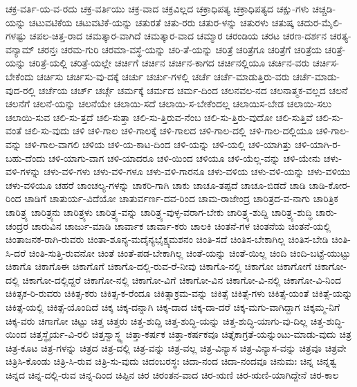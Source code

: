{ಚಕ್ರ-ವರ್ತಿ-ಯ-ವ-ರದು
ಚಕ್ರ-ವರ್ತಿಯು
ಚಕ್ರ-ವಾದ
ಚಕ್ರವಿಲ್ಲದ
ಚಕ್ರಾಧಿಪತ್ಯ
ಚಕ್ರಾಧಿಪತ್ಯದ
ಚಕ್ಷು-ಗಳು
ಚಚ್ಚಡಿ-ಯನ್ನು
ಚಟುವಟಿಕೆಯ
ಚಟುವಟಿಕೆ-ಯನ್ನು
ಚತುರತೆ
ಚತು-ರರು
ಚತುರ-ಳನ್ನು
ಚತುರಳು
ಚತುಷ್ಕ
ಚದುರ-ಮೈಲಿ-ಗಳಷ್ಟು
ಚಪಲ-ಚಿತ್ತ-ರಾದ
ಚಮತ್ಕಾರ-ವಾಗಿದೆ
ಚಮತ್ಕಾರ-ವಾದ
ಚಮ್ಮಾರ
ಚರಂಡಿಯ
ಚರಟ
ಚರಣ-ದರ್ಶನ
ಚರತ್ಯ-ವನ್ಯಾಮ್
ಚರನ್ತಃ
ಚರಮ-ಗುರಿ
ಚರಮಾ-ವಸ್ಥೆ-ಯನ್ನು
ಚರಿ-ತೆ-ಯನ್ನು
ಚರಿತ್ರೆ
ಚರಿತ್ರೆಗೂ
ಚರಿತ್ರೆಗೆ
ಚರಿತ್ರೆಯ
ಚರಿತ್ರೆ-ಯನ್ನು
ಚರಿತ್ರೆ-ಯಲ್ಲಿ
ಚರಿತ್ರೆ-ಯಲ್ಲೇ
ಚರ್ಚಿಗೆ
ಚರ್ಚಿನ
ಚರ್ಚಿನ-ಕಾಗದ
ಚರ್ಚಿನಲ್ಲಿಯೂ
ಚರ್ಚಿನ-ವರು
ಚರ್ಚಿಸ-ಬೇಕೆಂದು
ಚರ್ಚಿಸು
ಚರ್ಚಿಸು-ವು-ದಕ್ಕೆ
ಚರ್ಚು
ಚರ್ಚು-ಗಳಲ್ಲಿ
ಚರ್ಚೆ
ಚರ್ಚೆ-ಮಾಡುತ್ತಿರು-ವರು
ಚರ್ಚೆ-ಮಾಡು-ವುದ-ರಲ್ಲಿ
ಚರ್ಚೆಯ
ಚರ್ಚ್
ಚರ್ಚ್ಗೆ
ಚರ್ಮಕ್ಕೆ
ಚರ್ಮದ
ಚರ್ಮ-ದಿಂದ
ಚಲನವಲ-ನದ
ಚಲನಾತ್ಮಕ-ವಲ್ಲದ
ಚಲನೆ
ಚಲನೆಗೆ
ಚಲನೆ-ಯನ್ನು
ಚಲನೆಯೇ
ಚಲಾಯಿ-ಸದೆ
ಚಲಾಯಿ-ಸ-ಬೇಕೆಂದಲ್ಲ
ಚಲಾಯಿಸ-ಬೇಡ
ಚಲಾಯಿ-ಸಲು
ಚಲಾಯಿ-ಸುವ
ಚಲಿ-ಸು-ತ್ತದೆ
ಚಲಿ-ಸುತ್ತಾ
ಚಲಿ-ಸು-ತ್ತಿರುವ-ನೆಂಬ
ಚಲಿ-ಸು-ತ್ತಿರು-ವುದೋ
ಚಲಿ-ಸುತ್ತಿವೆ
ಚಲಿ-ಸು-ವಂತೆ
ಚಲಿ-ಸು-ವುದು
ಚಳಿ
ಚಳಿ-ಗಾಲ
ಚಳಿ-ಗಾಲಕ್ಕೆ
ಚಳಿ-ಗಾಲದ
ಚಳಿ-ಗಾಲ-ದಲ್ಲಿ
ಚಳಿ-ಗಾಲ-ದಲ್ಲಿಯೂ
ಚಳಿ-ಗಾಲ-ವನ್ನು
ಚಳಿ-ಗಾಲ-ವಾಗಲಿ
ಚಳಿಯ
ಚಳಿ-ಯ-ಕಾಟ-ದಿಂದ
ಚಳಿ-ಯನ್ನು
ಚಳಿ-ಯಲ್ಲಿ
ಚಳಿ-ಯಾಗಿತ್ತು
ಚಳಿ-ಯಾಗಿ-ರ-ಬಹು-ದೆಂದು
ಚಳಿ-ಯಾಗು-ವಾಗ
ಚಳಿ-ಯಾದರೂ
ಚಳಿ-ಯಿಂದ
ಚಳಿಯೂ
ಚಳಿ-ಯೆಲ್ಲ-ವನ್ನು
ಚಳಿ-ಯೇನು
ಚಳು-ವಳಿ-ಗಳನ್ನು
ಚಳು-ವಳಿ-ಗಳು
ಚಳು-ವಳಿ-ಗಳೂ
ಚಳು-ವಳಿ-ಗಾರನೂ
ಚಳು-ವಳಿಯ
ಚಳು-ವಳಿ-ಯನ್ನು
ಚಳು-ವಳಿಯು
ಚಳು-ವಳಿಯೂ
ಚಹರೆ
ಚಾಂಚಲ್ಯ-ಗಳನ್ನು
ಚಾಕರಿ-ಗಾಗಿ
ಚಾಕು
ಚಾಚೂ-ತಪ್ಪದೆ
ಚಾಚೂ-ಬಿಡದೆ
ಚಾಡಿ
ಚಾಡಿ-ಕೋರ-ರಿಂದ
ಚಾಡಿಗೆ
ಚಾತುರ್ಯ-ವಿದೆಯೋ
ಚಾತುರ್ವರ್ಣ-ದವ-ರಿಂದ
ಚಾಮ-ರಾಜೇಂದ್ರ
ಚಾರಿತ್ರದ-ವ-ನಾಗು
ಚಾರಿತ್ರಿಕ
ಚಾರಿತ್ರ್ಯ
ಚಾರಿತ್ರ್ಯನು
ಚಾರಿತ್ರ್ಯಳು
ಚಾರಿತ್ರ್ಯ-ವನ್ನು
ಚಾರಿತ್ರ್ಯ-ವುಳ್ಳ-ವರಾಗ-ಬೇಕು
ಚಾರಿತ್ರ್ಯ-ಶುದ್ದಿ
ಚಾರಿತ್ರ್ಯ-ಶುದ್ಧಿ
ಚಾರು-ಚಂದ್ರರ
ಚಾರುವಿನ
ಚಾರ್ಜು-ಮಾಡಿ
ಚಾರ್ವಾಕ
ಚಾರ್ವಾ-ಕರು
ಚಾಲಕಿ
ಚಿಂತನೆ-ಗಳ
ಚಿಂತನೆಯ
ಚಿಂತನೆ-ಯಲ್ಲಿ
ಚಿಂತಾಜನಕ-ರಾಗಿ-ರುವರು
ಚಿಂತಾ-ಶೂನ್ಯ-ಮದೈನ್ಯಭೈಕ್ಷ್ಯಮಶನಂ
ಚಿಂತಿ-ಸದೆ
ಚಿಂತಿಸ-ಬೇಕಾಗಿಲ್ಲ
ಚಿಂತಿಸ-ಬೇಡಿ
ಚಿಂತಿ-ಸಿ-ದರೆ
ಚಿಂತಿ-ಸುತ್ತಿ-ರುವನೋ
ಚಿಂತೆ
ಚಿಂತೆ-ಪಡ-ಬೇಕಾಗಿಲ್ಲ
ಚಿಂತೆ-ಯನ್ನು
ಚಿಂತೆ-ಯಿಲ್ಲ
ಚಿಂದಿ
ಚಿಂದಿ-ಬಟ್ಟೆ-ಯುಟ್ಟು
ಚಿಕಾಗೊ
ಚಿಕಾಗೊಈ
ಚಿಕಾಗೊಗೆ
ಚಿಕಾಗೊ-ದಲ್ಲಿ-ರುವ-ರೆ-ನೀವು
ಚಿಕಾಗೊ-ನಲ್ಲಿ
ಚಿಕಾಗೋ
ಚಿಕಾಗೋಗೆ
ಚಿಕಾಗೋ-ದಲ್ಲಿ
ಚಿಕಾಗೋ-ದಲ್ಲಿದ್ದರೆ
ಚಿಕಾಗೋ-ನಲ್ಲಿ
ಚಿಕಾಗೋ-ವಿಗೆ
ಚಿಕಾಗೋ-ವಿನ
ಚಿಕಾಗೋ-ವಿ-ನಲ್ಲಿ
ಚಿಕಾಗೋ-ವಿ-ನಿಂದ
ಚಿಕಿತ್ಸಕ-ರಿ-ರುವರು
ಚಿಕಿತ್ಸ-ಕರು
ಚಿಕಿತ್ಸ-ಕ-ರೆಂದೂ
ಚಿಕಿತ್ಸಾಕ್ರಮ-ವನ್ನು
ಚಿಕಿತ್ಸೆ
ಚಿಕಿತ್ಸೆ-ಗಳು
ಚಿಕಿತ್ಸೆ-ಯಂತೆ
ಚಿಕಿತ್ಸೆ-ಯನ್ನು
ಚಿಕಿತ್ಸೆ-ಯಲ್ಲಿ
ಚಿಕಿತ್ಸೆ-ಯೊಂದಿದೆ
ಚಿಕ್ಕ
ಚಿಕ್ಕ-ದನ್ನಾಗಿ
ಚಿಕ್ಕ-ದಾದ
ಚಿಕ್ಕ-ದಾ-ದರೆ
ಚಿಕ್ಕ-ಮಗು-ವಾಗಿದ್ದಾಗ
ಚಿಕ್ಕಮ್ಮ-ನಿಗೆ
ಚಿಕ್ಕ-ವರು
ಚಿಗಾಗೋ
ಚಿಟ್ಟು
ಚಿತ್ತ
ಚಿತ್ತರು
ಚಿತ್ತ-ಶುದ್ದಿ
ಚಿತ್ತ-ಶುದ್ಧಿ-ಯನ್ನು
ಚಿತ್ತ-ಶುದ್ಧಿ-ಯಾಗು-ವು-ದಿಲ್ಲ
ಚಿತ್ತ-ಶುದ್ಧಿ-ಯಿಂದ
ಚಿತ್ತಸ್ಥೈರ್ಯ-ವಿ-ರಲಿ
ಚಿತ್ತಸ್ವಾಸ್ಥ್ಯ
ಚಿತ್ತಾ-ಕರ್ಷಕ
ಚಿತ್ತಾ-ಕರ್ಷಕವೂ
ಚಿತ್ತೈಕಾಗ್ರತೆ-ಯನ್ನುಂಟು-ಮಾಡು-ವುದು
ಚಿತ್ರ
ಚಿತ್ರ-ಕೂಟ
ಚಿತ್ರ-ಗಳನ್ನು
ಚಿತ್ರದ
ಚಿತ್ರ-ದಲ್ಲಿ
ಚಿತ್ರ-ವನ್ನು
ಚಿತ್ರ-ವಲ್ಲ
ಚಿತ್ರ-ವಿನ್ಯಾಸ
ಚಿತ್ರ-ವಿನ್ಯಾಸ-ವನ್ನು
ಚಿತ್ರವೂ
ಚಿತ್ರವೇ
ಚಿತ್ರಿಸಿ-ಕೊಂಡು
ಚಿತ್ರಿ-ಸಿ-ರುವ
ಚಿತ್ರಿ-ಸು-ವುದು
ಚಿದಂಬರಸ್ಥಃ
ಚಿದಾ-ನಂದ
ಚಿದಾ-ನಂದವೂ
ಚಿನುಮಃ
ಚಿನ್ನ
ಚಿನ್ನತ್ವ
ಚಿನ್ನದ
ಚಿನ್ನ-ದಲ್ಲಿ-ರುವ
ಚಿನ್ನ-ದಿಂದ
ಚಿಪ್ಪಿನ
ಚಿರ
ಚಿರಂತನ-ವಾದ
ಚಿರ-ಋಣಿ
ಚಿರ-ಋಣಿ-ಯಾಗಿದ್ದೇನೆ
ಚಿರ-ಕಾಲ
}
